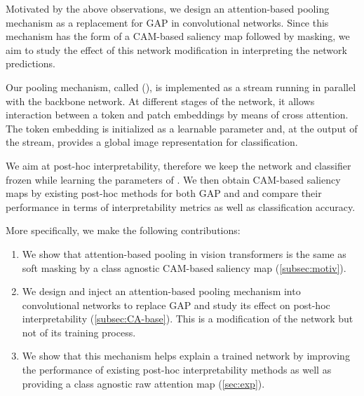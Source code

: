 Motivated by the above observations, we design an attention-based pooling mechanism as a replacement for GAP in convolutional networks. Since this mechanism has the form of a CAM-based saliency map followed by masking, we aim to study the effect of this network modification in interpreting the network predictions.

Our pooling mechanism, called \emph{\OURS} (\emph{\Ours}), is implemented as a stream running in parallel with the backbone network. At different stages of the network, it allows interaction between a \cls token and patch embeddings by means of cross attention. The \cls token embedding is initialized as a learnable parameter and, at the output of the stream, provides a global image representation for classification.

We aim at post-hoc interpretability, therefore we keep the network and classifier frozen while learning the parameters of \Ours. We then obtain CAM-based saliency maps by existing post-hoc methods for both GAP and \Ours and compare their performance in terms of interpretability metrics as well as classification accuracy.

More specifically, we make the following contributions:
\begin{enumerate}[itemsep=2pt, parsep=0pt, topsep=3pt]
    \item We show that attention-based pooling in vision transformers is the same as soft masking by a class agnostic CAM-based saliency map (\autoref{subsec:motiv}).
    \item We design and inject an attention-based pooling mechanism into convolutional networks to replace GAP and study its effect on post-hoc interpretability (\autoref{subsec:CA-base}). This is a modification of the network but not of its training process.
    \item We show that this mechanism helps explain a trained network by improving the performance of existing post-hoc interpretability methods as well as providing a class agnostic raw attention map (\autoref{sec:exp}).
\end{enumerate}
